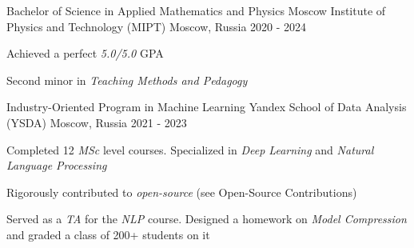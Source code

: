 
\begin{cventries}
  \cventry
    {Bachelor of Science in Applied Mathematics and Physics} %
    {Moscow Institute of Physics and Technology (MIPT)} %
    {Moscow, Russia} %
    {2020 - 2024} %
    {
        \begin{cvitems}
         \item { Achieved a perfect \textit{5.0/5.0} GPA }
         \item { Second minor in \textit{Teaching Methods and Pedagogy} }
        \end{cvitems}
    }
    
  \cventry
    {Industry-Oriented Program in Machine Learning } %
    {Yandex School of Data Analysis (YSDA)}
    {Moscow, Russia}
    {2021 - 2023}
    {
      \begin{cvitems} %
        \item { Completed 12 \textit{MSc} level courses. Specialized in \textit{Deep Learning} and \textit{Natural Language Processing} }
        \item { Rigorously contributed to \textit{open-source} (see Open-Source Contributions)}
        \item { Served as a \textit{TA} for the \textit{NLP} course. Designed a homework on \textit{Model Compression} and graded a class of 200+ students on it }
      \end{cvitems}
    }
\end{cventries}
